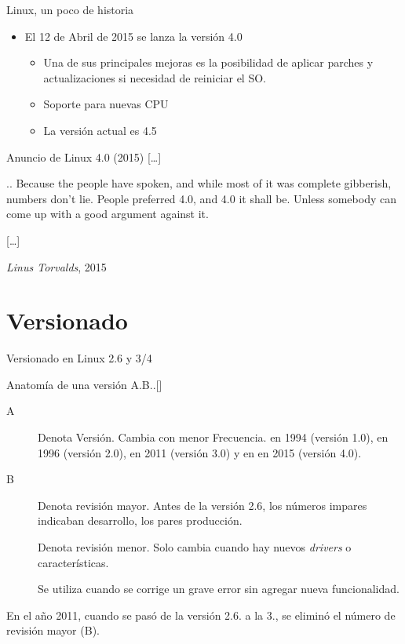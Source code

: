 \begin{frame}{Linux, un poco de historia}
\begin{itemize}
\item El 12 de Abril de 2015 se lanza la versión 4.0
    \begin{itemize}
    \item Una de sus principales mejoras es la posibilidad de aplicar parches y actualizaciones si necesidad de reiniciar el SO.
    \item Soporte para nuevas CPU
    \item La versión actual es 4.5
    \end{itemize}
\end{itemize}

\begin{block}{Anuncio de Linux 4.0 \hfill (2015)}
  [\ldots]

  .. Because the people have spoken, and while most of it was complete
gibberish, numbers don't lie. People preferred 4.0, and 4.0 it shall
be. Unless somebody can come up with a good argument against it.

  [\ldots]

  \hfill \emph{Linus Torvalds},  2015
\end{block}
\end{frame}


\section{Versionado}
\begin{frame}{Versionado en Linux 2.6 y 3/4}
  
  \begin{block}{Anatomía de una versión}
    \alert{A}.\alert{B}..[]
  \end{block}

    { \tiny
  \begin{description}

  \item[\alert{A}] Denota Versión. Cambia con menor Frecuencia. en 1994
    (versión 1.0), en 1996 (versión 2.0), en 2011 (versión 3.0) y en  en 2015 (versión 4.0).

  \item[\alert{B}] Denota revisión mayor. Antes de la versión 2.6, los
    números impares indicaban desarrollo, los pares producción.

  \item[] Denota revisión menor. Solo cambia cuando hay nuevos
    \textit{drivers} o características.

  \item[] Se utiliza cuando se corrige un grave error sin
    agregar nueva funcionalidad.
  \end{description} }

  \vfill \pause En el año 2011, cuando se pasó de la versión
  \alert{2}.\alert{6}. a la \alert{3}., se
  eliminó el número de revisión mayor (\alert{B})\cite{Torvalds2011}.

\end{frame}

